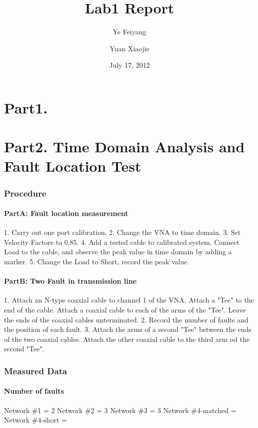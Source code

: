 \documentclass[11pt,oneside,a4paper]{report}
\begin{document}
\title{Lab1 Report}
\author{Ye Feiyang \and Yuan Xiaojie}
\date{July 17, 2012}
\maketitle

\part*{Part1. }

\part*{Part2. Time Domain Analysis and Fault Location Test}
\section*{Procedure}
\subsection*{PartA: Fault location measurement}
1. Carry out one port calibration.
2. Change the VNA to time domain.
3. Set Velocity Factore to 0.85.
4. Add a tested cable to calibrated system. Connect Load to the cable, and observe the peak value in time domain by adding a marker.
5. Change the Load to Short, record the peak value.
\subsection*{PartB: Two Fault in transmission line}
1. Attach an N-type coaxial cable to channel 1 of the VNA. Attach a "Tee" to the end of the cable. Attach a coaxial cable to each of the arms of the "Tee". Leave the ends of the coaxial cables unterminated.
2. Record the number of faults and the position of each fault.
3. Attach the arms of a second "Tee" between the ends of the two coaxial cables. Attach the other coaxial cable to the third arm od the second "Tee".
\section*{Measured Data}
\subsection*{Number of faults}
Network \#1 = 2
Network \#2 = 3
Network \#3 = 3
Network \#4-matched = \infty
Network \#4-short = \infty
\end{document}
